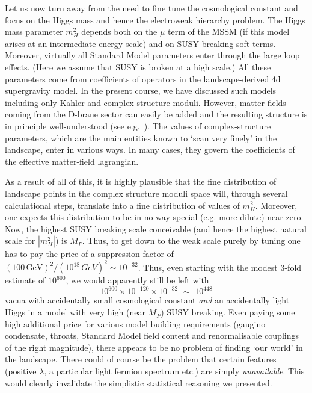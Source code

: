 \documentclass[12pt]{article}
\newcommand{\be}{\begin{equation}}
\newcommand{\ee}{\end{equation}}
\numberwithin{equation}{section}
\begin{document}
Let us now turn away from the need to fine tune the cosmological constant and focus on the Higgs mass and hence the electroweak hierarchy problem. The  Higgs mass parameter $m_H^2$ depends both on the $\mu$ term of the MSSM (if this model arises at an intermediate energy scale) and on SUSY breaking soft terms. Moreover, virtually all Standard Model parameters enter through the large loop effects. (Here we assume that SUSY is broken at a high scale.) All these parameters come from coefficients of operators in the landscape-derived 4d supergravity model. In the present course, we have discussed such models including only Kahler and complex structure moduli. However, matter fields coming from the D-brane sector can easily be added and the resulting structure is in principle well-understood (see e.g.~\cite{Ibanez:2012zz, Kaplunovsky:1993rd, Brignole:1998dxa, Jockers:2004yj, Conlon:2006tj, Kerstan:2011dy}). The values of complex-structure parameters, which are the main entities known to `scan very finely' in the landscape, enter in various ways. In many cases, they govern the coefficients of the effective matter-field lagrangian.

As a result of all of this, it is highly plausible that the fine distribution of landscape points in the complex structure moduli space will, through several calculational steps, translate into a fine distribution of values of $m_H^2$. Moreover, one expects this distribution to be in no way special (e.g. more dilute) near zero. Now, the highest SUSY breaking scale conceivable (and hence the highest natural scale for $|m_H^2|$) is $M_P$. Thus, to get down to the weak scale purely by tuning one has to pay the price of a suppression factor of $(100\,\mbox{GeV})^2/ (10^{18}\,GeV)^2\sim 10^{-32}$. Thus, even starting with the modest 3-fold estimate of $10^{600}$, we would apparently still be left with 
\be
10^{600}\times 10^{-120} \times 10^{-32}\,\,\sim\,\,10^{448}
\ee
vacua with accidentally small cosmological constant {\it and} an accidentally light Higgs in a model with very high (near $M_P$) SUSY breaking. Even paying some high additional price for various model building requirements (gaugino condensate, throats, Standard Model field content and renormalisable couplings of the right magnitude), there appears to be no problem of finding `our world' in the landscape. There could of course be the problem that certain features (positive $\lambda$, a particular light fermion spectrum etc.) are simply {\it unavailable}. This would clearly invalidate the simplistic statistical reasoning we presented.
\end{document}
